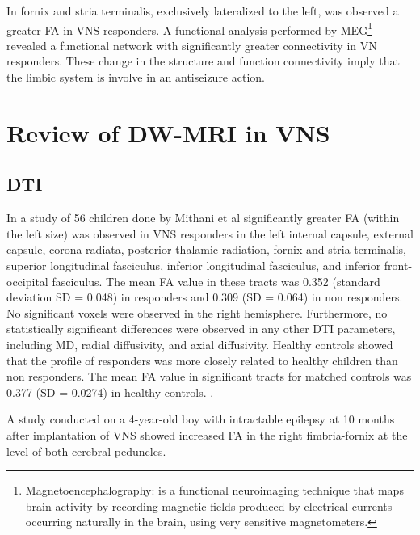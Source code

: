     In fornix and stria terminalis, exclusively lateralized to the left, was observed a greater FA in VNS responders.
    A functional analysis performed by MEG\footnote{Magnetoencephalography: is a functional neuroimaging technique that maps brain activity by recording magnetic fields produced by electrical currents occurring naturally in the brain, using very sensitive magnetometers.} revealed a functional network with significantly greater connectivity in VN responders.
    These change in the structure and function connectivity imply that the limbic system is involve in an antiseizure action. \cite{Mithani2019, Mithani2020}


\section{Review of DW-MRI in VNS}
  \subsection*{DTI}
  In a study of 56 children done by Mithani et al significantly greater FA (within the left size) was observed in VNS responders in the left internal capsule, external capsule, corona radiata, posterior thalamic radiation, fornix and stria terminalis, superior longitudinal fasciculus, inferior longitudinal fasciculus, and inferior front-occipital fasciculus. The mean FA value in these tracts was 0.352 (standard deviation SD = 0.048) in responders and 0.309 (SD = 0.064) in non responders. No significant voxels were observed in the right hemisphere. Furthermore, no statistically significant differences were observed in any other DTI parameters, including MD, radial diffusivity, and axial diffusivity. Healthy controls showed that the profile of responders was more closely related to healthy children than non responders. The mean FA value in significant tracts for matched controls was 0.377 (SD = 0.0274) in healthy controls. \cite{Mithani2019}.

  A study conducted on a 4-year-old boy with intractable epilepsy at 10 months after implantation of VNS showed increased FA in the right fimbria-fornix at the level of both cerebral peduncles. \cite{Fan2014}

